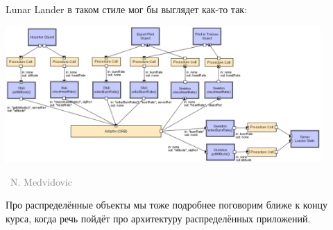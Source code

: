 \documentclass[a5paper]{article}
\newcommand{\attribution}[1] {
    \vspace{-4mm}\begin{flushright}\begin{scriptsize}\textcolor{gray}
    {\textcopyright\, #1}\end{scriptsize}\end{flushright}
}
\begin{document}
Lunar Lander в таком стиле мог бы выглядет как-то так:

\begin{center}
    \includegraphics[width=0.9\textwidth]{corbaLL.png}
    \attribution{N. Medvidovic}
\end{center}

Про распределённые объекты мы тоже подробнее поговорим ближе к концу курса, когда речь пойдёт про архитектуру распределённых приложений.
\end{document}
